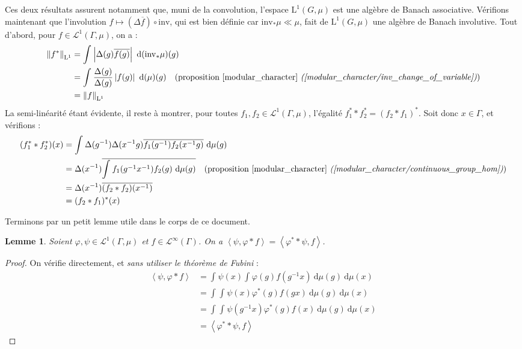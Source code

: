 \documentclass[a4paper,12pt]{article}
\newtheorem{lemma}[theorem]{Lemme}
\newcommand{\norm}[1]{\left\Vert #1\right\Vert}
\newcommand{\abs}[1]{\left\vert#1\right\vert}
\newcommand{\ket}[1]{\left\langle #1 \right\rangle}
\newcommand{\integral}[4]{\int_{#1}^{#2} #3~\mathrm{d}#4}
\newcommand{\inv}{^{-1}}
\newcommand{\comp}{\circ}
\newcommand{\invop}{\mathrm{inv}}
\begin{document}
Ces deux résultats assurent notamment que, muni de la convolution, l'espace $\mathrm{L}^1(G, \mu)$
est une algèbre de Banach associative. Vérifions maintenant que l'involution $f\mapsto(\Delta\overline{f})\comp\invop$, qui est bien définie car 
$\invop_*\mu\ll\mu$, fait de $\mathrm{L}^1(G, \mu)$ une algèbre de Banach involutive. Tout d'abord, pour $f\in\mathscr{L}^1(\Gamma, \mu)$, on a : 
\begin{align*}
    \norm{f^*}_{\mathrm{L}^1} 
        &= \integral{}{}{\abs{\Delta(g)\overline{f(g)}}}{(\invop_*\mu)(g)} \\
        &= \integral{}{}{\frac{\Delta(g)}{\Delta(g)}\abs{f(g)}}{(\mu)(g)} \quad\text{(proposition \ref{modular_character} \textit{(\ref{modular_character/inv_change_of_variable})})}\\
        &= \norm{f}_{\mathrm{L}^1}
\end{align*}
La semi-linéarité étant évidente, il reste à montrer, pour toutes $f_1, f_2\in\mathscr{L}^1(\Gamma, \mu)$, l'égalité $f_1^*\ast f_2^* = (f_2\ast f_1)^*$. Soit donc $x\in\Gamma$, et vérifions :
\begin{align*}
    (f_1^*\ast f_2^*)(x) 
        &= \integral{}{}{\Delta(g\inv)\Delta(x\inv g)\overline{f_1(g\inv) f_2(x\inv g)}}{\mu(g)} \\
        &= \Delta(x\inv)\overline{\integral{}{}{f_1(g\inv x\inv) f_2(g)}{\mu(g)}} \quad\text{(proposition \ref{modular_character} \textit{(\ref{modular_character/continuous_group_hom})})}\\
        &= \Delta(x\inv)\overline{(f_2\ast f_2)(x\inv)} \\
        &= (f_2\ast f_1)^*(x)
\end{align*}

Terminons par un petit lemme utile dans le corps de ce document. 

\begin{lemma}\label{ket_conv}
    Soient $\varphi, \psi\in\mathscr{L}^1(\Gamma, \mu)$ et $f\in\mathscr{L}^\infty(\Gamma)$. 
    On a $\ket{\psi, \varphi\ast f} = \ket{\varphi^*\ast\psi, f}$.
\end{lemma}

\begin{proof}
    On vérifie directement, et \emph{sans utiliser le théorème de Fubini} :
    \begin{align*}
        \ket{\psi, \varphi\ast f} 
            &= \integral{}{}{\psi(x)\integral{}{}{\varphi(g)f(g\inv x)}{\mu(g)}}{\mu(x)} \\
            &= \integral{}{}{\integral{}{}{\psi(x)\varphi^*(g)f(g x)}{\mu(g)}}{\mu(x)} \\
            &= \integral{}{}{\integral{}{}{\psi(g\inv x)\varphi^*(g)f(x)}{\mu(g)}}{\mu(x)} \\
            &= \ket{\varphi^*\ast\psi, f} 
    \end{align*}
\end{proof}
\end{document}

